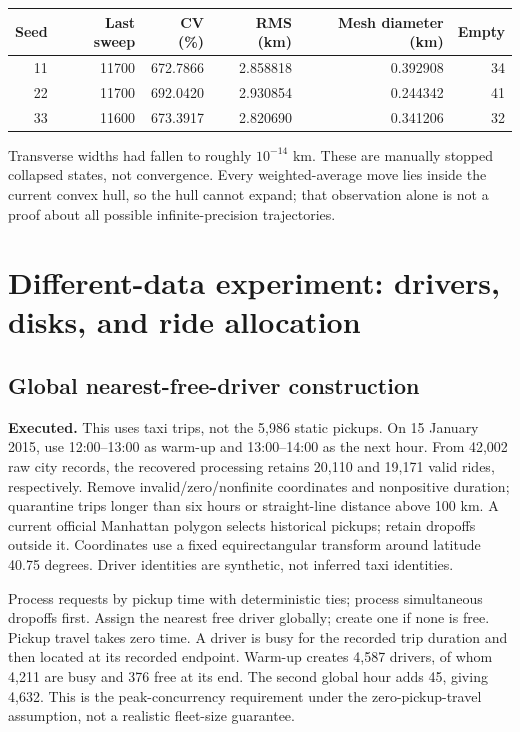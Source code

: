 \documentclass[11pt]{article}
\begin{document}
\begin{center}\begin{tabular}{rrrrrr}
\toprule Seed & Last sweep & CV (\%) & RMS (km) & Mesh diameter (km) & Empty\\\midrule
11&11700&672.7866&2.858818&0.392908&34\\
22&11700&692.0420&2.930854&0.244342&41\\
33&11600&673.3917&2.820690&0.341206&32\\\bottomrule
\end{tabular}\end{center}
Transverse widths had fallen to roughly $10^{-14}$ km. These are manually
stopped collapsed states, not convergence. Every weighted-average move lies
inside the current convex hull, so the hull cannot expand; that observation
alone is not a proof about all possible infinite-precision trajectories.

\section{Different-data experiment: drivers, disks, and ride allocation}
\subsection{Global nearest-free-driver construction}
\textbf{Executed.} This uses taxi trips, not the 5,986 static pickups.
On 15 January 2015, use 12:00--13:00 as warm-up and 13:00--14:00 as the next
hour. From 42,002 raw city records, the recovered processing retains 20,110 and
19,171 valid rides, respectively. Remove invalid/zero/nonfinite coordinates and
nonpositive duration; quarantine trips longer than six hours or straight-line
distance above 100 km. A current official Manhattan polygon selects historical
pickups; retain dropoffs outside it. Coordinates use a fixed equirectangular
transform around latitude 40.75 degrees. Driver identities are synthetic,
not inferred taxi identities.

Process requests by pickup time with deterministic ties; process simultaneous
dropoffs first. Assign the nearest free driver globally; create one if none is
free. Pickup travel takes zero time. A driver is busy for the recorded trip
duration and then located at its recorded endpoint. Warm-up creates 4,587
drivers, of whom 4,211 are busy and 376 free at its end. The second global hour
adds 45, giving 4,632. This is the peak-concurrency requirement under the
zero-pickup-travel assumption, not a realistic fleet-size guarantee.
\end{document}
